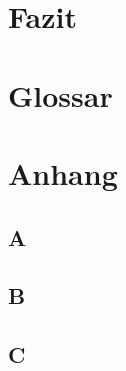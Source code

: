 \documentclass[12pt,a4paper]{scrartcl}
\begin{document}
\section{Fazit}
\section{Glossar}
\section{Anhang}
\subsection{A}
\subsection{B}
\subsection{C}
\end{document}
